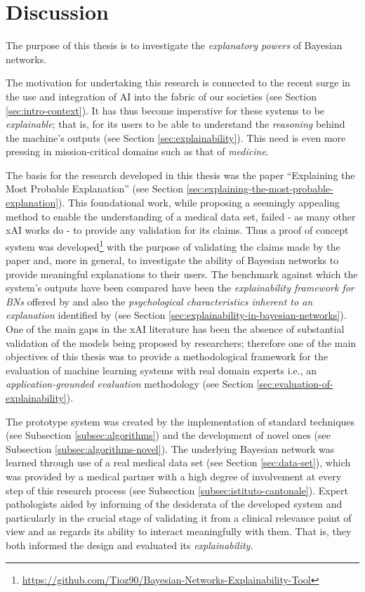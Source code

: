 \section{Discussion}
The purpose of this thesis is to investigate the \textit{explanatory powers} of Bayesian networks.

The motivation for undertaking this research is connected to the recent surge in the use and integration of AI into the fabric of our societies (see Section \ref{sec:intro-context}).
It has thus become imperative for these systems to be \textit{explainable}; that is, for its users to be able to understand the \textit{reasoning} behind the machine's outputs (see Section \ref{sec:explainability}).
This need is even more pressing in mission-critical domains such as that of \textit{medicine}.

The basis for the research developed in this thesis was the paper \enquote{Explaining the Most Probable Explanation} \citep{Butz2018} (see Section \ref{sec:explaining-the-most-probable-explanation}).
This foundational work, while proposing a seemingly appealing method to enable the understanding of a medical data set, failed - as many other xAI works do - to provide any validation for its claims.
Thus a proof of concept system was developed\footnote{\url{https://github.com/Tioz90/Bayesian-Networks-Explainability-Tool}} with the purpose of validating the claims made by the paper and, more in general, to investigate the ability of Bayesian networks to provide meaningful explanations to their users.
The benchmark against which the system's outputs have been compared have been the \textit{explainability framework for BNs} offered by \citet{lacave2002review} and also the \textit{psychological characteristics inherent to an explanation} identified by \citet{miller2018explanation} (see Section  \ref{sec:explainability-in-bayesian-networks}).
One of the main gaps in the xAI literature has been the absence of substantial validation of the models being proposed by researchers; therefore one of the main objectives of this thesis was to provide a methodological framework for the evaluation of machine learning systems with real domain experts i.e., an \textit{application-grounded evaluation} methodology \citep{doshi2017towards} (see Section \ref{sec:evaluation-of-explainability}).

The prototype system was created by the implementation of standard techniques (see Subsection \ref{subsec:algorithms}) and the development of novel ones (see Subsection \ref{subsec:algorithms-novel}).
The underlying Bayesian network was learned through use of a real medical data set (see Section \ref{sec:data-set}), which was provided by a medical partner with a high degree of involvement at every step of this research process (see Subsection \ref{subsec:istituto-cantonale}).
Expert pathologists aided by informing of the desiderata of the developed system and particularly in the crucial stage of validating it from a clinical relevance point of view and as regards its ability to interact meaningfully with them.
That is, they both informed the design and evaluated its \textit{explainability}.

